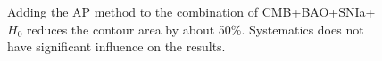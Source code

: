 \documentclass[iop]{emulateapj}
\begin{document}
\begin{figure}
{{   %
   Adding the AP method to the combination of CMB+BAO+SNIa+$H_0$ reduces the contour area by about 50\%. %
   Systematics does not have significant influence on the results.%
   }}
\end{figure}
\end{document}
